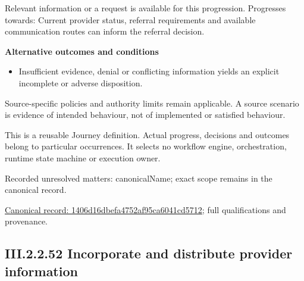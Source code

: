 Relevant information or a request is available for this progression. Progresses towards: Current provider status, referral requirements and available communication routes can inform the referral decision.



\par\medskip\textbf{Alternative outcomes and conditions}\par


\begin{itemize}


\item Insufficient evidence, denial or conflicting information yields an explicit incomplete or adverse disposition.

\end{itemize}


Source-specific policies and authority limits remain applicable. A source scenario is evidence of intended behaviour, not of implemented or satisfied behaviour.



This is a reusable Journey definition. Actual progress, decisions and outcomes belong to particular occurrences. It selects no workflow engine, orchestration, runtime state machine or execution owner.


{\small Recorded unresolved matters: canonicalName; exact scope remains in the canonical record.}\par
{\footnotesize \href{../../../../continuum/strategy/value-stream/1406d16dbefa4752af95ca6041cd5712.md}{Canonical record: 1406d16dbefa4752af95ca6041cd5712}; full qualifications and provenance.}\par
\subsection*{III.2.2.52 Incorporate and distribute provider information}
\label{navigation:III.2.2.52}

